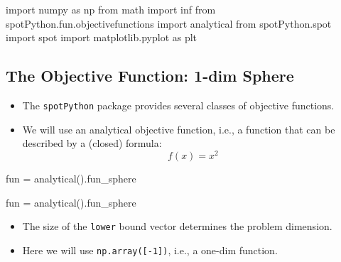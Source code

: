 \documentclass[
  letterpaper,
  DIV=11,
  numbers=noendperiod]{scrreprt}
\newenvironment{Shaded}{\begin{snugshade}}{\end{snugshade}}
\newcommand{\ImportTok}[1]{\textcolor[rgb]{0.00,0.46,0.62}{#1}}
\newcommand{\NormalTok}[1]{\textcolor[rgb]{0.00,0.23,0.31}{#1}}
\newcommand{\OperatorTok}[1]{\textcolor[rgb]{0.37,0.37,0.37}{#1}}
\providecommand{\tightlist}{%
  \setlength{\itemsep}{0pt}\setlength{\parskip}{0pt}}\usepackage{longtable,booktabs,array}
\begin{document}
\begin{Shaded}
\begin{Highlighting}[]
\ImportTok{import}\NormalTok{ numpy }\ImportTok{as}\NormalTok{ np}
\ImportTok{from}\NormalTok{ math }\ImportTok{import}\NormalTok{ inf}
\ImportTok{from}\NormalTok{ spotPython.fun.objectivefunctions }\ImportTok{import}\NormalTok{ analytical}
\ImportTok{from}\NormalTok{ spotPython.spot }\ImportTok{import}\NormalTok{ spot}
\ImportTok{import}\NormalTok{ matplotlib.pyplot }\ImportTok{as}\NormalTok{ plt}
\end{Highlighting}
\end{Shaded}

\hypertarget{the-objective-function-1-dim-sphere}{%
\subsection{The Objective Function: 1-dim
Sphere}\label{the-objective-function-1-dim-sphere}}

\begin{itemize}
\tightlist
\item
  The \texttt{spotPython} package provides several classes of objective
  functions.
\item
  We will use an analytical objective function, i.e., a function that
  can be described by a (closed) formula: \[f(x) = x^2 \]
\end{itemize}

\begin{Shaded}
\begin{Highlighting}[]
\NormalTok{fun }\OperatorTok{=}\NormalTok{ analytical().fun\_sphere}
\end{Highlighting}
\end{Shaded}

\begin{Shaded}
\begin{Highlighting}[]
\NormalTok{fun }\OperatorTok{=}\NormalTok{ analytical().fun\_sphere}
\end{Highlighting}
\end{Shaded}

\begin{itemize}
\tightlist
\item
  The size of the \texttt{lower} bound vector determines the problem
  dimension.
\item
  Here we will use \texttt{np.array({[}-1{]})}, i.e., a one-dim
  function.
\end{itemize}
\end{document}
